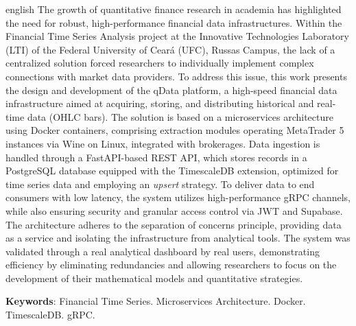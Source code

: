 \begin{resumo}[Abstract]
 \begin{otherlanguage*}{english}
The growth of quantitative finance research in academia has highlighted the need for robust, high-performance financial data infrastructures. Within the Financial Time Series Analysis project at the Innovative Technologies Laboratory (LTI) of the Federal University of Ceará (UFC), Russas Campus, the lack of a centralized solution forced researchers to individually implement complex connections with market data providers. To address this issue, this work presents the design and development of the qData platform, a high-speed financial data infrastructure aimed at acquiring, storing, and distributing historical and real-time data (OHLC bars). The solution is based on a microservices architecture using Docker containers, comprising extraction modules operating MetaTrader 5 instances via Wine on Linux, integrated with brokerages. Data ingestion is handled through a FastAPI-based REST API, which stores records in a PostgreSQL database equipped with the TimescaleDB extension, optimized for time series data and employing an \textit{upsert} strategy. To deliver data to end consumers with low latency, the system utilizes high-performance gRPC channels, while also ensuring security and granular access control via JWT and Supabase. The architecture adheres to the separation of concerns principle, providing data as a service and isolating the infrastructure from analytical tools. The system was validated through a real analytical dashboard by real users, demonstrating efficiency by eliminating redundancies and allowing researchers to focus on the development of their mathematical models and quantitative strategies.

   \vspace{\onelineskip}
 
   \noindent 
   \textbf{Keywords}: Financial Time Series. Microservices Architecture. Docker. TimescaleDB. gRPC.
 \end{otherlanguage*}
\end{resumo}
